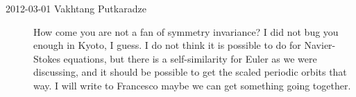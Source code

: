 \begin{description}
\item[2012-03-01 Vakhtang Putkaradze] How come you are not a fan of
symmetry invariance? I did not bug you enough in Kyoto, I guess. I do not
think it is possible to do for Navier-Stokes equations, but there is a
self-similarity for Euler as we were discussing, and it should be
possible to get the scaled periodic orbits that way. I will write to
Francesco maybe we can get something going together.

\end{description}



\renewcommand{\ssp}{a}
